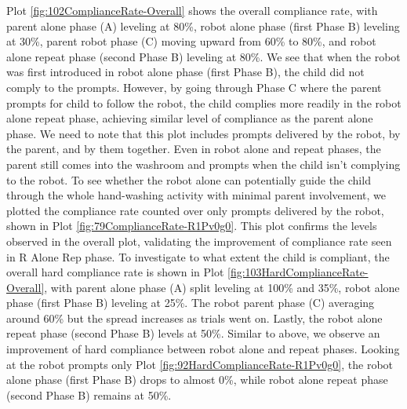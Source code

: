 \documentclass{ut-thesis}
\begin{document}
Plot \ref{fig:102ComplianceRate-Overall} shows the overall compliance rate, with parent alone phase (A) leveling at 80\%, robot alone phase (first Phase B) leveling at 30\%, parent robot phase (C) moving upward from 60\% to 80\%, and robot alone repeat phase (second Phase B) leveling at 80\%.  We see that when the robot was first introduced in robot alone phase (first Phase B), the child did not comply to the prompts.  However, by going through Phase C where the parent prompts for child to follow the robot, the child complies more readily in the robot alone repeat phase, achieving similar level of compliance as the parent alone phase.  We need to note that this plot includes prompts delivered by the robot, by the parent, and by them together.  Even in robot alone and repeat phases, the parent still comes into the washroom and prompts when the child isn't complying to the robot.  To see whether the robot alone can potentially guide the child through the whole hand-washing activity with minimal parent involvement, we plotted the compliance rate counted over only prompts delivered by the robot, shown in Plot \ref{fig:79ComplianceRate-R1Pv0g0}.  This plot confirms the levels observed in the overall plot, validating the improvement of compliance rate seen in R Alone Rep phase.  To investigate to what extent the child is compliant, the overall hard compliance rate is shown in Plot \ref{fig:103HardComplianceRate-Overall}, with parent alone phase (A) split leveling at 100\% and 35\%, robot alone phase (first Phase B) leveling at 25\%.  The robot parent phase (C) averaging around 60\% but the spread increases as trials went on.  Lastly, the robot alone repeat phase (second Phase B) levels at 50\%.  Similar to above, we observe an improvement of hard compliance between robot alone and repeat phases.  Looking at the robot prompts only Plot \ref{fig:92HardComplianceRate-R1Pv0g0}, the robot alone phase (first Phase B) drops to almost 0\%, while robot alone repeat phase (second Phase B) remains at 50\%.
\end{document}

